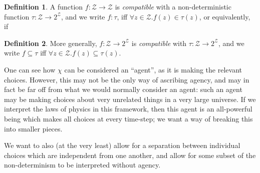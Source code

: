 \documentclass{article}
\theoremstyle{definition}
\newtheorem{defn}{Definition}
\newcommand{\Z}{\mathcal Z}
\begin{document}
	\vspace{1em}
	\begin{defn}
		A function $f : \Z \to \Z$ is \emph{compatible} with a non-deterministic function $\tau : \Z \to 2^\Z$, and we write $f : \tau$, iff $\forall z \in \Z. f(z) \in \tau(z)$, or equivalently, if
		\begin{center}
		\end{center}	
		\vspace{1em}	
	\end{defn}
	
	\begin{defn}
		More generally, $f : \Z \to 2^\Z$ is \emph{compatible} with $\tau : \Z \to 2^\Z$, and we write $f \subseteq \tau$ iff $\forall z \in \Z. f(z) \subseteq \tau(z)$.
	\end{defn}



	One can see how $\chi$ can be considered an ``agent'', as it is making the relevant choices. However, this may not be the only way of ascribing agency, and may in fact be far off from what we would normally consider an agent: such an agent may be making choices about very unrelated things in a very large universe. If we interpret the laws of physics in this framework, then this agent is an all-powerful being which makes all choices at every time-step; we want a way of breaking this into smaller pieces.


	We want to also (at the very least) allow for a separation between individual choices which are independent from one another, and allow for some subset of the non-determinism to be interpreted without agency. 
	
\end{document}
